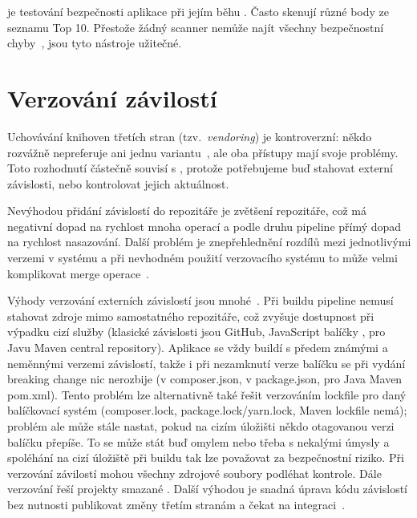          je testování bezpečnosti aplikace při jejím běhu \cite{dast}. Často skenují různé body ze seznamu  Top 10. Přestože žádný scanner nemůže najít všechny bezpečnostní chyby~\cite{netsparker-scanner}, jsou tyto nástroje užitečné.

    \section{Verzování závilostí}
        Uchovávání knihoven třetích stran (tzv.~\textit{vendoring}) je kontroverzní: někdo rozvážně nepreferuje ani jednu variantu~\cite{copes-commit-npm}, ale oba přístupy mají svoje problémy. Toto rozhodnutí částečně souvisí s \CI, protože potřebujeme buď stahovat externí závislosti, nebo kontrolovat jejich aktuálnost.


        Nevýhodou přidání závislostí do repozitáře je zvětšení repozitáře, což má negativní dopad na rychlost mnoha operací a podle druhu \CICD pipeline přímý dopad na rychlost nasazování. Další problém je znepřehlednění rozdílů mezi jednotlivými verzemi v systému a při nevhodném použití verzovacího systému to může velmi komplikovat merge operace~\cite{should-i-vendor}.

        Výhody verzování externích závislostí jsou mnohé~\cite{andrawos2017cloud}. Při buildu \CICD pipeline nemusí stahovat zdroje mimo samostatného repozitáře, což zvyšuje dostupnost při výpadku cizí služby (klasické závislosti jsou GitHub, JavaScript balíčky , pro Javu Maven central repository). Aplikace se vždy buildí s předem známými a neměnnými verzemi závislostí, takže i při nezamknutí verze balíčku se při vydání breaking change nic nerozbije (v  composer.json, v  package.json, pro Java Maven pom.xml). Tento problém lze alternativně také řešit verzováním lockfile pro daný balíčkovací systém (composer.lock, package.lock/yarn.lock, Maven lockfile nemá); problém ale může stále nastat, pokud na cizím úložišti někdo otagovanou verzi balíčku přepíše. To se může stát buď omylem nebo třeba s nekalými úmysly a spoléhání na cizí úložiště při buildu tak lze považovat za bezpečnostní riziko. Při verzování závilostí mohou všechny zdrojové soubory podléhat kontrole. Dále verzování řeší projekty smazané \cite{williams-left-pad}. Další výhodou je snadná úprava kódu závislostí bez nutnosti publikovat změny třetím stranám a čekat na integraci~\cite{rusnavcko2014fedora}.
